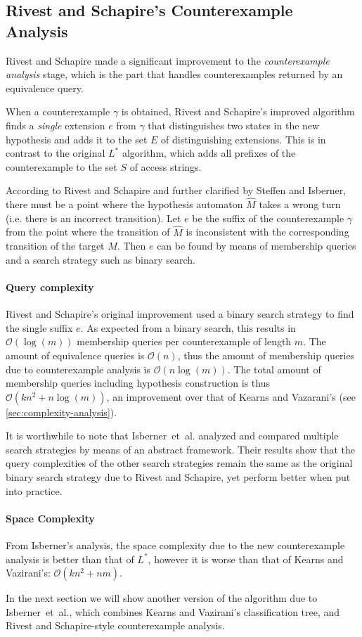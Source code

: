 \documentclass[multi,crop=false,class=article]{standalone}
\begin{document}
\subsection{Rivest and Schapire's Counterexample Analysis}
\label{sec:rivest-schap-count}
Rivest and Schapire made a significant improvement\cite{Rivest1993} to the
\textit{counterexample analysis} stage, which is the part that handles
counterexamples returned by an equivalence query.

When a counterexample $\gamma$ is obtained, Rivest and Schapire's improved
algorithm finds a \textit{single} extension $e$ from $\gamma$ that distinguishes
two states in the new hypothesis and adds it to the set $E$ of distinguishing
extensions. This is in contrast to the original $L^*$ algorithm, which adds all
prefixes of the counterexample to the set $S$ of access strings.

According to Rivest and Schapire\cite{Rivest1993} and further clarified by
Steffen\cite{Steffen2011} and Isberner\cite{Isberner2014a}, there must be a
point where the hypothesis automaton $\hat M$ takes a wrong turn (i.e. there is
an incorrect transition). Let $e$ be the suffix of the counterexample $\gamma$
from the point where the transition of $\hat M$ is inconsistent with the
corresponding transition of the target $M$. Then $e$ can be found by means of
membership queries and a search strategy such as binary search.

\paragraph{Query complexity} Rivest and Schapire's original improvement used a
binary search strategy to find the single suffix $e$. As expected from a binary
search, this results in $\mathcal{O}(\log(m))$ membership queries per
counterexample of length $m$. The amount of equivalence queries is
$\mathcal{O}(n)$, thus the amount of membership queries due to counterexample
analysis is $\mathcal{O}(n\log(m))$. The total amount of membership queries
including hypothesis construction is thus $\mathcal{O}(kn^2 + n\log(m))$, an
improvement over that of Kearns and Vazarani's (see
\cref{sec:complexity-analysis}).

It is worthwhile to note that Isberner~et~al. analyzed and compared multiple
search strategies by means of an abstract framework\cite{Isberner2014a}. Their
results show that the query complexities of the other search strategies remain
the same as the original binary search strategy due to Rivest and Schapire, yet
perform better when put into practice.

\paragraph{Space Complexity} From Isberner's analysis\cite{Isberner2014b}, the
space complexity due to the new counterexample analysis is better than that of
$L^*$, however it is worse than that of Kearns and Vazirani's:
$\mathcal{O}(kn^2 + nm)$.

In the next section we will show another version of the algorithm due to
Isberner~et~al., which combines Kearns and Vazirani's classification tree, and
Rivest and Schapire-style counterexample analysis.  
\end{document}
